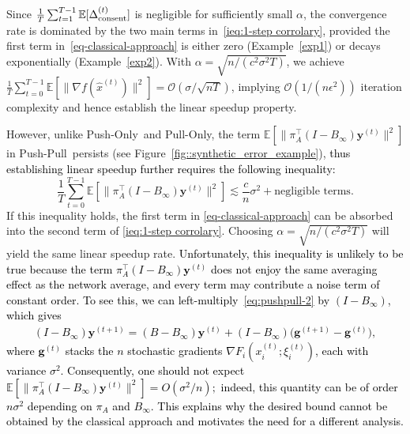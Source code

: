 \documentclass[10pt]{article}
\newcommand{\vg}{{\mathbf{g}}}
\newcommand{\vy}{{\mathbf{y}}}
\newcommand{\EE}{\mathbb{E}}
\newcommand{\pushonly}{{\sc Push-Only}\xspace}
\newcommand{\pushpull}{{\sc Push-Pull}\xspace}
\newcommand{\pullonly}{{\sc Pull-Only}\xspace}
\newcommand{\revision}[1]{\textcolor{black}{#1}}
\begin{document}
Since $\tfrac{1}{T}\sum_{t=1}^{T-1}\EE[\Delta^{(t)}_{\rm consent}]$ is negligible for sufficiently small $\alpha$, the convergence rate is dominated by the two main terms in~\eqref{ieq:1-step corrolary}, provided the first term in~\eqref{eq-classical-approach} is either zero (Example~\ref{exp1}) or decays exponentially (Example~\ref{exp2}). With $\alpha = \sqrt{n/(c^2\sigma^2 T)}$, we achieve
$\tfrac{1}{T}\sum_{t=0}^{T-1}\EE[\|\nabla f(\hat{x}^{(t)})\|^2] = \mathcal{O}(\sigma/\sqrt{nT})$, 
implying $\mathcal{O}(1/(n\epsilon^2))$ iteration complexity and hence establish the linear speedup property.  

However, unlike \pushonly\ and \pullonly, the term $\EE[\|\pi_A^\top(I-B_\infty)\vy^{(t)}\|^2]$ in \pushpull\ persists (see Figure~\ref{fig::synthetic_error_example}), \revision{thus establishing linear speedup further requires the following inequality:}
\begin{equation}\label{ieq:strong ieq}
    \frac{1}{T}\sum_{t=0}^{T-1}\mathbb{E}[\|\pi_A^\top(I-B_\infty)\mathbf{y}^{(t)}\|^2]\lesssim\frac{c}{n}\sigma^2 + \text{negligible terms}.
\end{equation}
If this inequality holds, the first term in \eqref{eq-classical-approach} can be absorbed into the second term of \eqref{ieq:1-step corrolary}. Choosing $\alpha = \sqrt{n/(c^2\sigma^2 T)}$ will yield the same linear speedup rate. \revision{Unfortunately, this inequality is unlikely to be true because the term
\(
\pi_A^\top(I-B_\infty)\mathbf{y}^{(t)}
\)
does not enjoy the same averaging effect as the network average, and every term may contribute a noise term of constant order. To see this, we can left-multiply~\eqref{eq:pushpull-2} by $(I-B_\infty)$, which gives  
\begin{align}
\label{2dhbae00}
(I-B_\infty)\vy^{(t+1)} = (B-B_\infty)\vy^{(t)} + (I-B_\infty)\big(\vg^{(t+1)}-\vg^{(t)}\big),
\end{align}
where $\vg^{(t)}$ stacks the $n$ stochastic gradients $\nabla F_i(x_i^{(t)};\xi_i^{(t)})$, each with variance $\sigma^2$.  Consequently, one should not expect
\(
\EE\!\left[\|\pi_A^\top (I-B_\infty)\vy^{(t)}\|^2\right]
= O(\sigma^2/n);
\)
indeed, this quantity can be of order $n\sigma^2$ depending on $\pi_A$ and $B_\infty$. This explains why the desired bound cannot be obtained by the classical approach and motivates the need for a different analysis.}
\end{document}
